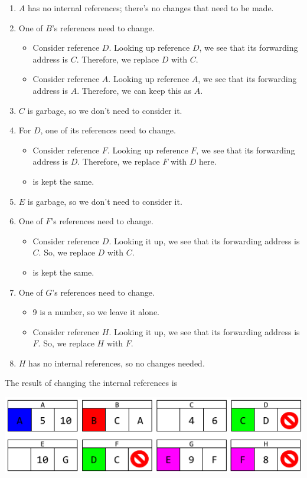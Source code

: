 \begin{enumerate}
    \item $A$ has no internal references; there's no changes that need to be made. 
    \item One of $B$'s references need to change. 
    \begin{itemize}
        \item Consider reference $D$. Looking up reference $D$, we see that its forwarding address is $C$. Therefore, we replace $D$ with $C$. 
        \item Consider reference $A$. Looking up reference $A$, we see that its forwarding address is $A$. Therefore, we can keep this as $A$. 
    \end{itemize}
    \item $C$ is garbage, so we don't need to consider it. 
    \item For $D$, one of its references need to change. 
    \begin{itemize}
        \item Consider reference $F$. Looking up reference $F$, we see that its forwarding address is $D$. Therefore, we replace $F$ with $D$ here. 
        \item {} is kept the same. 
    \end{itemize}
    \item $E$ is garbage, so we don't need to consider it. 
    \item One of $F$'s references need to change. 
    \begin{itemize}
        \item Consider reference $D$. Looking it up, we see that its forwarding address is $C$. So, we replace $D$ with $C$.
        \item {} is kept the same.
    \end{itemize}
    \item One of $G$'s references need to change. 
    \begin{itemize}
        \item 9 is a number, so we leave it alone. 
        \item Consider reference $H$. Looking it up, we see that its forwarding address is $F$. So, we replace $H$ with $F$. 
    \end{itemize}
    \item $H$ has no internal references, so no changes needed.
\end{enumerate}
The result of changing the internal references is 
\begin{center}
    \includegraphics[scale=0.5]{assets/GCAlg4_1.png}
\end{center}

